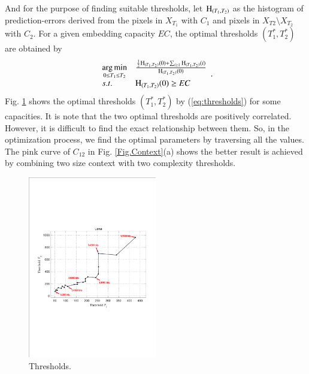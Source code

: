 \documentclass[review,3p,10pt,sort&compress]{elsarticle}
\begin{document}
And for the purpose of finding suitable thresholds, let ${\rm H}_{(T_1, T_2)}$ as the histogram of prediction-errors derived from the pixels in $X_{T_1}$ with $C_1$ and pixels in $X_{T2} \setminus X_{T_2}$ with $C_2$. For a given embedding capacity $EC$, the optimal thresholds $(T_1^*, T_2^*)$ are obtained by
\begin{equation}\label{eq:thresholds}
\begin{array}{ll}
\mathop{\arg\min}\limits_{0 \leq T_1 \leq T_2} & \frac{\frac{1}{2}{\rm H}_{(T_1, T_2)}(0) + \sum_{i \geq 1}{\rm H}_{(T_1, T_2)}(i)}{{\rm H}_{(T_1, T_2)}(0)}\\
s.t.                                    & {\rm H}_{(T_1, T_2)}(0) \geq EC
\end{array}.
\end{equation}
Fig. \ref{Fig.Thresholds} shows the optimal thresholds $(T_1^*, T_2^*)$ by (\ref{eq:thresholds}) for some capacities. It is note that the two optimal thresholds are positively correlated. However, it is difficult to find the exact relationship between them. So, in the optimization process, we find the optimal parameters by traversing all the values. The pink curve of $C_{12}$ in Fig. \ref{Fig.Context}(a) shows the better result is achieved by combining two size context with two complexity thresholds.
\begin{figure}
\centering
\includegraphics[width=0.5\textwidth]{figures/Thresholds.pdf}
\centering
\caption{Thresholds.}
\label{Fig.Thresholds}
\end{figure}
\end{document}
